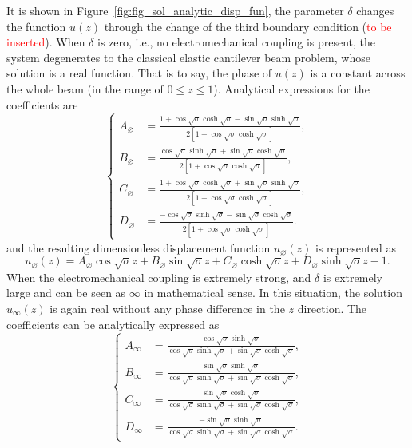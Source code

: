 \documentclass{article}
\begin{document}
It is shown in Figure~\ref{fig:fig_sol_analytic_disp_fun}, the parameter $\delta$ changes the function $u(z)$ through the change of the third boundary condition (\textcolor{red}{to be inserted}). When $\delta$ is zero, i.e., no electromechanical coupling is present, the system degenerates to the classical elastic cantilever beam problem, whose solution is a real function. That is to say, the phase of $u(z)$ is a constant across the whole beam (in the range of $0 \leq z \leq 1$).
Analytical expressions for the coefficients are 
\begin{equation}
    \left\{\begin{aligned}
        A_{\varnothing} &= \frac{ 1 + \cos\sqrt{\sigma } \cosh\sqrt{\sigma } - \sin\sqrt{\sigma } \sinh\sqrt{\sigma} }{2 \left[ 1 + \cos\sqrt{\sigma } \cosh\sqrt{\sigma } \right]}, \\
        B_{\varnothing} &= \frac{ \cos\sqrt{\sigma } \sinh\sqrt{\sigma } + \sin\sqrt{\sigma } \cosh\sqrt{\sigma} }{2 \left[ 1 + \cos\sqrt{\sigma } \cosh\sqrt{\sigma } \right]}, \\
        C_{\varnothing} &= \frac{ 1 + \cos\sqrt{\sigma } \cosh\sqrt{\sigma } + \sin\sqrt{\sigma } \sinh\sqrt{\sigma} }{2 \left[ 1 + \cos\sqrt{\sigma } \cosh\sqrt{\sigma } \right]}, \\
        D_{\varnothing} &= \frac{ -\cos\sqrt{\sigma } \sinh\sqrt{\sigma } - \sin\sqrt{\sigma } \cosh\sqrt{\sigma} }{2 \left[ 1 + \cos\sqrt{\sigma } \cosh\sqrt{\sigma } \right]}.
    \end{aligned}\right.
    \label{eq:eq_disp_func_coeffs_exps_zero}
\end{equation}
and the resulting dimensionless displacement function $u_{\varnothing} (z)$ is represented as
\begin{equation}
    u_{\varnothing} (z) = A_{\varnothing} \cos{\sqrt{\sigma}z} + B_{\varnothing} \sin{\sqrt{\sigma}z} + C_{\varnothing} \cosh{\sqrt{\sigma}z} + D_{\varnothing} \sinh{\sqrt{\sigma}z} - 1.
\end{equation}
When the electromechanical coupling is extremely strong, and $\delta$ is extremely large and can be seen as $\infty$ in mathematical sense. In this situation, the solution $u_\infty (z)$ is again real without any phase difference in the $z$ direction. The coefficients can be analytically expressed as 
\begin{equation}
    \left\{\begin{aligned}
        A_\infty &= \frac{ \cos\sqrt{\sigma } \sinh\sqrt{\sigma } }{ \cos\sqrt{\sigma } \sinh\sqrt{\sigma } + \sin\sqrt{\sigma } \cosh\sqrt{\sigma } }, \\
        B_\infty &= \frac{ \sin\sqrt{\sigma } \sinh\sqrt{\sigma } }{ \cos\sqrt{\sigma } \sinh\sqrt{\sigma } + \sin\sqrt{\sigma } \cosh\sqrt{\sigma } }, \\
        C_\infty &= \frac{ \sin\sqrt{\sigma } \cosh\sqrt{\sigma } }{ \cos\sqrt{\sigma } \sinh\sqrt{\sigma } + \sin\sqrt{\sigma } \cosh\sqrt{\sigma } }, \\
        D_\infty &= \frac{ - \sin\sqrt{\sigma } \sinh\sqrt{\sigma } }{ \cos\sqrt{\sigma } \sinh\sqrt{\sigma } + \sin\sqrt{\sigma } \cosh\sqrt{\sigma } }.
    \end{aligned}\right.
    \label{eq:eq_disp_func_coeffs_exps_infty}
\end{equation}
\end{document}
